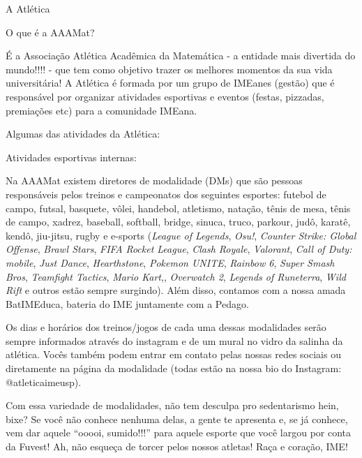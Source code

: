\begin{secao}{A Atlética} %

\begin{subsecao}{O que é a AAAMat?}

É a Associação Atlética Acadêmica da Matemática - a entidade mais divertida do
mundo!!!! - que tem como objetivo trazer os melhores momentos da sua vida
universitária! A Atlética é formada por um grupo de IMEanes (gestão) que é
responsável por organizar atividades esportivas e eventos (festas, pizzadas,
premiações etc) para a comunidade IMEana.

\end{subsecao}

Algumas das atividades da Atlética:

\begin{subsecao}{Atividades esportivas internas:}

Na AAAMat existem diretores de modalidade (DMs) que são pessoas responsáveis
pelos treinos e campeonatos dos seguintes esportes: futebol de campo, futsal,
basquete, vôlei, handebol, atletismo, natação, tênis de mesa, tênis de campo,
xadrez, baseball, softball, bridge, sinuca, truco, parkour, judô, karatê,
kendô, jiu-jitsu, rugby e e-sports (\textit{League of Legends}, \textit{Osu!},
\textit{Counter Strike: Global Offense}, \textit{Brawl Stars}, \textit{FIFA}
\textit{Rocket League}, \textit{Clash Royale}, \textit{Valorant},
\textit{Call of Duty: mobile}, \textit{Just Dance}, \textit{Hearthstone},
\textit{Pokemon UNITE}, \textit{Rainbow 6}, \textit{Super Smash Bros},
\textit{Teamfight Tactics}, \textit{Mario Kart},, \textit{Overwatch 2},
\textit{Legends of Runeterra}, \textit{Wild Rift} e outros estão sempre surgindo).
Além disso, contamos com a nossa amada BatIMEduca, bateria do IME juntamente
com a Pedago.

Os dias e horários dos treinos/jogos de cada uma dessas modalidades serão
sempre informados através do instagram e de um mural no vidro da salinha da atlética.
Vocês também podem entrar em contato pelas nossas redes sociais ou diretamente
na página da modalidade (todas estão na nossa bio do Instagram: @atleticaimeusp).

Com essa variedade de modalidades, não tem desculpa pro sedentarismo hein,
bixe? Se você não conhece nenhuma delas, a gente te apresenta e, se já conhece,
vem dar aquele “ooooi, sumido!!!” para aquele esporte que você largou por conta
da Fuvest! Ah, não esqueça de torcer pelos nossos atletas! Raça e coração, IME!


\end{subsecao}
\end{secao}
